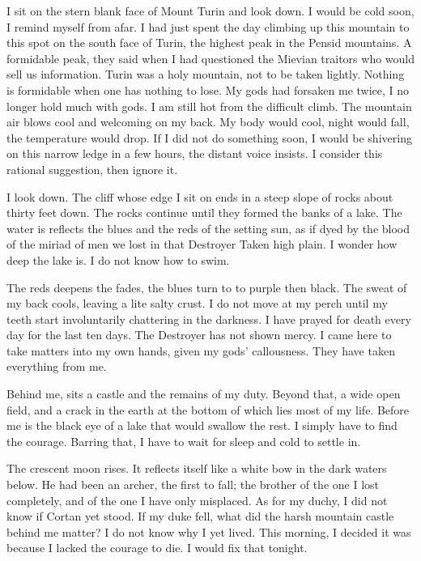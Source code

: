 \documentclass{article}
\begin{document}
I sit on the stern blank face of Mount Turin and look down. I would be cold soon, I remind myself from afar. I had just spent the day climbing up this mountain to this spot on the south face of Turin, the highest peak in the Pensid mountains. A formidable peak, they said when I had questioned the Mievian traitors who would sell us information. Turin was a holy mountain, not to be taken lightly. Nothing is formidable when one has nothing to lose. My gods had forsaken me twice, I no longer hold much with gods. I am still hot from the difficult climb. The mountain air blows cool and welcoming on my back. My body would cool, night would fall, the temperature would drop. If I did not do something soon, I would be shivering on this narrow ledge in a few hours, the distant voice insists. I consider this rational suggestion, then ignore it.

I look down. The cliff whose edge I sit on ends in a steep slope of rocks about thirty feet down. The rocks continue until they formed the banks of a lake. The water is reflects the blues and the reds of the setting sun, as if dyed by the blood of the miriad of men we lost in that Destroyer Taken high plain. I wonder how deep the lake is. I do not know how to swim. 

The reds deepens the fades, the blues turn to to purple then black. The sweat of my back cools, leaving a lite salty crust. I do not move at my perch until my teeth start involuntarily chattering in the darkness. I have prayed for death every day for the last ten days. The Destroyer has not shown mercy. I came here to take matters into my own hands, given my gods' callousness. They have taken everything from me. 

Behind me, sits a castle and the remains of my duty. Beyond that, a wide open field, and a crack in the earth at the bottom of which lies most of my life. Before me is the black eye of a lake that would swallow the rest. I simply have to find the courage. Barring that, I have to wait for sleep and cold to settle in.

The crescent moon rises. It reflects itself like a white bow in the dark waters below. He had been an archer, the first to fall; the brother of the one I lost completely, and of the one I have only misplaced. As for my duchy, I did not know if Cortan yet stood. If my duke fell, what did the harsh mountain castle behind me matter? I do not know why I yet lived. This morning, I decided it was because I lacked the courage to die. I would fix that tonight.
\end{document}
